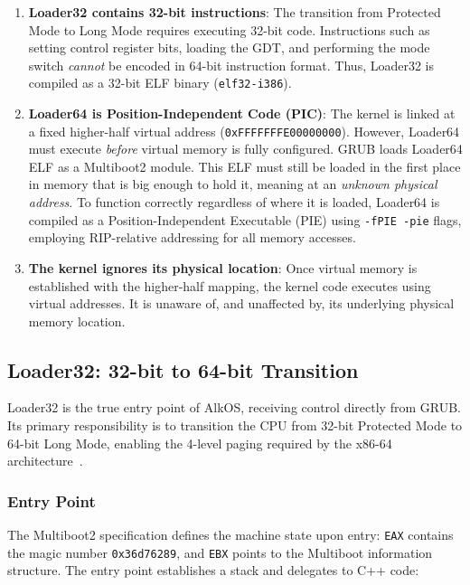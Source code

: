 \documentclass[a4paper,10pt,twoside]{report}
\theoremstyle{definition}
\begin{document}
\begin{enumerate}
    \item \textbf{Loader32 contains 32-bit instructions}: The transition from Protected Mode to Long Mode requires executing 32-bit code. Instructions such as setting control register bits, loading the GDT, and performing the mode switch \textit{cannot} be encoded in 64-bit instruction format. Thus, Loader32 is compiled as a 32-bit ELF binary (\texttt{elf32-i386}).
    
    \item \textbf{Loader64 is Position-Independent Code (PIC)}: The kernel is linked at a fixed higher-half virtual address (\texttt{0xFFFFFFFE00000000}). However, Loader64 must execute \textit{before} virtual memory is fully configured. GRUB loads Loader64 ELF as a Multiboot2 module. This ELF must still be loaded in the first place in memory that is big enough to hold it, meaning at an \textit{unknown physical address}. To function correctly regardless of where it is loaded, Loader64 is compiled as a Position-Independent Executable (PIE) using \texttt{-fPIE -pie} flags, employing RIP-relative addressing for all memory accesses.
    
    \item \textbf{The kernel ignores its physical location}: Once virtual memory is established with the higher-half mapping, the kernel code executes using virtual addresses. It is unaware of, and unaffected by, its underlying physical memory location.
\end{enumerate}

\subsection{Loader32: 32-bit to 64-bit Transition}

Loader32 is the true entry point of AlkOS, receiving control directly from GRUB. Its primary responsibility is to transition the CPU from 32-bit Protected Mode to 64-bit Long Mode, enabling the 4-level paging required by the x86-64 architecture~\cite{Intel-ControlRegisters}.

\subsubsection{Entry Point}

The Multiboot2 specification defines the machine state upon entry: \texttt{EAX} contains the magic number \texttt{0x36d76289}, and \texttt{EBX} points to the Multiboot information structure. The entry point establishes a stack and delegates to C++ code:
\end{document}
